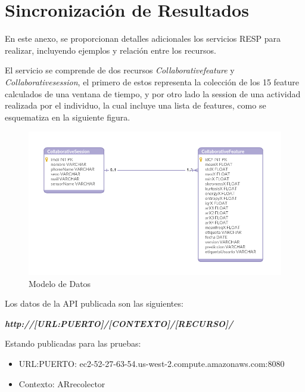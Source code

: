


\chapter{Sincronización de Resultados}

\label{chapA:rest-api}

En este anexo, se proporcionan detalles adicionales los servicios RESP para realizar, incluyendo ejemplos y relación entre los recursos.

El servicio se comprende de dos recursos \textit{Collaborativefeature} y \textit{Collaborativesession}, el primero de estos representa la colección de los 15 feature calculados de una ventana de tiempo, y por otro lado la session de una actividad realizada por el individuo, la cual incluye una lista de features, como se esquematiza en la siguiente figura.

\begin{figure}[!htbp]
	\centering
	\includegraphics[width=0.7\linewidth]{anexos/der}
	\caption[Modelo de Datos]{\label{fig:der}Modelo de Datos}
\end{figure}

Los datos de la API publicada son las siguientes:

\textit{\textbf{http://[URL:PUERTO]/[CONTEXTO]/[RECURSO]/}}

Estando publicadas para las pruebas:

\begin{itemize}
	\item URL:PUERTO: ec2-52-27-63-54.us-west-2.compute.amazonaws.com:8080
	\item Contexto: ARrecolector
\end{itemize}



